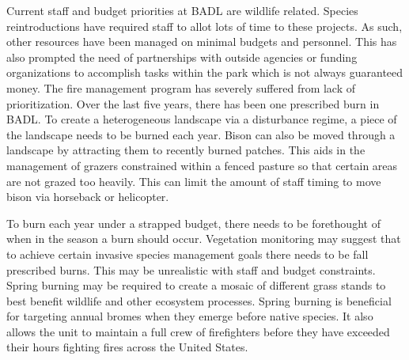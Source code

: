 Current staff and budget priorities at BADL are wildlife related.
Species reintroductions have required staff to allot lots of time to
these projects. As such, other resources have been managed on minimal
budgets and personnel. This has also prompted the need of partnerships
with outside agencies or funding organizations to accomplish tasks
within the park which is not always guaranteed money. The fire
management program has severely suffered from lack of prioritization.
Over the last five years, there has been one prescribed burn in BADL. To
create a heterogeneous landscape via a disturbance regime, a piece of
the landscape needs to be burned each year. Bison can also be moved
through a landscape by attracting them to recently burned patches. This
aids in the management of grazers constrained within a fenced pasture so
that certain areas are not grazed too heavily. This can limit the amount
of staff timing to move bison via horseback or helicopter.

To burn each year under a strapped budget, there needs to be forethought
of when in the season a burn should occur. Vegetation monitoring may
suggest that to achieve certain invasive species management goals there
needs to be fall prescribed burns. This may be unrealistic with staff
and budget constraints. Spring burning may be required to create a
mosaic of different grass stands to best benefit wildlife and other
ecosystem processes. Spring burning is beneficial for targeting annual
bromes when they emerge before native species. It also allows the unit
to maintain a full crew of firefighters before they have exceeded their
hours fighting fires across the United States.


